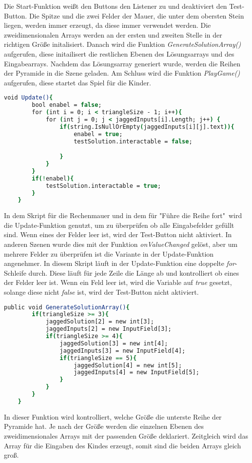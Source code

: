 Die Start-Funktion weißt den Buttons den Listener zu und deaktiviert den Test-Button. Die Spitze und die zwei Felder der Mauer, die unter dem obersten Stein liegen, werden immer erzeugt, da diese immer verwendet werden. Die zweidimensionalen Arrays werden an der ersten und zweiten Stelle in der richtigen Größe initalisiert. Danach wird die Funktion \textit{GenerateSolutionArray()} aufgerufen, diese initailisert die restlichen Ebenen des Lösungsarrays und des Eingabearrays. Nachdem das Lösungsarray generiert wurde, werden die Reihen der Pyramide in die Szene geladen. Am Schluss wird die Funktion \textit{PlayGame()} aufgerufen, diese startet das Spiel für die Kinder.\\
\begin{lstlisting}[language=csh, caption={Triangle.cs Update-Funktion}]
	void Update(){
		bool enabel = false;
		for (int i = 0; i < triangleSize - 1; i++){
			for (int j = 0; j < jaggedInputs[i].Length; j++) {
				if(string.IsNullOrEmpty(jaggedInputs[i][j].text)){
					enabel = true;
					testSolution.interactable = false;

				}
			}
		}
		if(!enabel){
			testSolution.interactable = true;
		}
	}
\end{lstlisting}
In dem Skript für die Rechenmauer und in dem für "Führe die Reihe fort"\, wird die Update-Funktion genutzt, um zu überprüfen ob alle Eingabefelder gefüllt sind. Wenn eines der Felder leer ist, wird der Test-Button nicht aktiviert. In anderen Szenen wurde dies mit der Funktion \textit{onValueChanged} gelöst, aber um mehrere Felder zu überprüfen ist die Variante in der Update-Funktion angenehmer. In diesem Skript läuft in der Update-Funktion eine doppelte \textit{for}-Schleife durch. Diese läuft für jede Zeile die Länge ab und kontrolliert ob eines der Felder leer ist. Wenn ein Feld leer ist, wird die  Variable auf \textit{true} gesetzt, solange diese nicht \textit{false} ist, wird der Test-Button nicht aktiviert.\\
\begin{lstlisting}[language=csh, caption={Triangle.cs GenerateSolutionArray-Funktion}]
	public void GenerateSolutionArray(){
		if(triangleSize >= 3){
			jaggedSolution[2] = new int[3];
			jaggedInputs[2] = new InputField[3];
			if(triangleSize >= 4){
				jaggedSolution[3] = new int[4];
				jaggedInputs[3] = new InputField[4];
				if(triangleSize == 5){
					jaggedSolution[4] = new int[5];
					jaggedInputs[4] = new InputField[5];
				}
			}
		}
	}
\end{lstlisting}
In dieser Funktion wird kontrolliert, welche Größe die unterste Reihe der Pyramide hat. Je nach der Größe werden die einzelnen Ebenen des zweidimensionales Arrays mit der passenden Größe deklariert. Zeitgleich wird das Array für die Eingaben des Kindes erzeugt, somit sind die beiden Arrays gleich groß.\\
